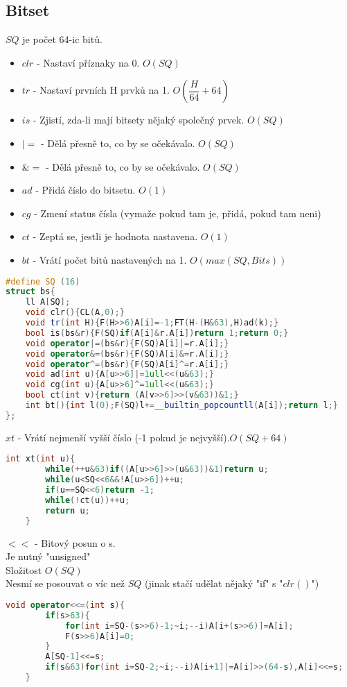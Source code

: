 \documentclass[11pt]{article}
\begin{document}
\subsection{Bitset}
$SQ$ je počet 64-ic bitů.
\begin{itemize}
\item $clr$ - Nastaví příznaky na 0. $O(SQ)$
\item $tr$ - Nastaví prvních \textsf{H} prvků na 1. $O(\dfrac{H}{64}+64)$
\item $is$ - Zjistí, zda-li mají bitsety nějaký společný prvek. $O(SQ)$
\item $|=$ - Dělá přesně to, co by se očekávalo. $O(SQ)$
\item $\&=$ - Dělá přesně to, co by se očekávalo. $O(SQ)$
\item $ad$ - Přidá číslo do bitsetu. $O(1)$
\item $cg$ - Zmení status čísla (vymaže pokud tam je, přidá, pokud tam neni)
\item $ct$ - Zeptá se, jestli je hodnota nastavena. $O(1)$
\item $bt$ - Vrátí počet bitů nastavených na 1. $O(max(SQ,Bits))$
\end{itemize}
\begin{lstlisting}[language=C++]
#define SQ (16)
struct bs{
    ll A[SQ];
    void clr(){CL(A,0);}
    void tr(int H){F(H>>6)A[i]=-1;FT(H-(H&63),H)ad(k);}
    bool is(bs&r){F(SQ)if(A[i]&r.A[i])return 1;return 0;}
    void operator|=(bs&r){F(SQ)A[i]|=r.A[i];}
    void operator&=(bs&r){F(SQ)A[i]&=r.A[i];}
    void operator^=(bs&r){F(SQ)A[i]^=r.A[i];}
    void ad(int u){A[u>>6]|=1ull<<(u&63);}
    void cg(int u){A[u>>6]^=1ull<<(u&63);} 
    bool ct(int v){return (A[v>>6]>>(v&63))&1;}
    int bt(){int l(0);F(SQ)l+=__builtin_popcountll(A[i]);return l;}
};
\end{lstlisting}
$xt$ - Vrátí nejmenší vyšší číslo (-1 pokud je nejvyšší).$O(SQ+64)$ 
\begin{lstlisting}[language=C++]
	int xt(int u){
        while(++u&63)if((A[u>>6]>>(u&63))&1)return u;
        while(u<SQ<<6&&!A[u>>6])++u;
        if(u==SQ<<6)return -1;
        while(!ct(u))++u;
        return u;
    }
\end{lstlisting}
$<<$ - Bitový posun o \textsf{s}.
\\Je nutný "unsigned"
\\Složitost $O(SQ)$
\\Nesmí se posouvat o víc než $SQ$ (jinak stačí udělat nějaký "if" s "$clr()$")
\begin{lstlisting}[language=C++]
	void operator<<=(int s){
        if(s>63){
            for(int i=SQ-(s>>6)-1;~i;--i)A[i+(s>>6)]=A[i];
            F(s>>6)A[i]=0;
        }
        A[SQ-1]<<=s;
        if(s&63)for(int i=SQ-2;~i;--i)A[i+1]|=A[i]>>(64-s),A[i]<<=s;
    }
\end{lstlisting}
\end{document}
